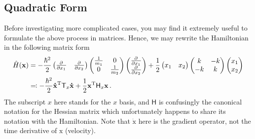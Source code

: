 \documentclass{article}
\theoremstyle{plain}\theoremheaderfont{\normalfont\itshape}\theorembodyfont{\rmfamily}\theoremseparator{.}\newtheorem*{rem}{Remark}\newtheorem*{ex}{Example}\newtheorem*{proof}{Proof}\newtheorem*{altp}{Alternative proof}
\theoremstyle{plain}\theoremheaderfont{\normalfont\bfseries}\theorembodyfont{\rmfamily}\theoremseparator{.}\newtheorem{thm}{Theorem}[section]\newtheorem{lem}[thm]{Lemma}\newtheorem{prop}[thm]{Proposition}\newtheorem*{cor}{Corollary}\newtheorem{defn}[thm]{Definition}\newtheorem{clm}[thm]{Claim}\newtheorem{clminproof}{Claim}
\theoremstyle{break}\theoremheaderfont{\normalfont\itshape}\theorembodyfont{\rmfamily}\theoremseparator{.\medskip}\newtheorem*{proofskip}{Proof}\newtheorem*{exs}{Examples}\newtheorem*{rems}{Remarks}
\theoremstyle{break}\theoremheaderfont{\normalfont\bfseries}\theorembodyfont{\rmfamily}\theoremseparator{.\medskip}\newtheorem{lemskip}[thm]{Lemma}\newtheorem{defnskip}[thm]{Definition}\newtheorem{propskip}[thm]{Proposition}\newtheorem{thmskip}[thm]{Theorem}
\numberwithin{equation}{section}
\newcommand{\tp}{^\mathrm{T}}
\newcommand{\pdv}[3][]{\frac{\partial^{#1} #2}{{\partial #3}^{#1}}}
\newcommand{\vb}[1]{\bm{\mathrm{#1}}}
\begin{document}
    \subsection{Quadratic Form}
    Before investigating more complicated cases, you may find it extremely useful to formulate the above process in matrices. Hence, we may rewrite the Hamiltonian in the following matrix form
    \begin{align}
        \hat{H}(\vb{x})&=-\frac{\hbar^2}{2}\begin{pmatrix}
            \pdv{}{x_1} & \pdv{}{x_2}
        \end{pmatrix}\begin{pmatrix}
            \frac{1}{m_1} & 0 \\
            0 & \frac{1}{m_2}
        \end{pmatrix}\begin{pmatrix}
            \pdv{}{x_1} \\ \pdv{}{x_2}
        \end{pmatrix}+\frac{1}{2}\begin{pmatrix}
            x_1 & x_2
        \end{pmatrix}\begin{pmatrix}
            k & -k \\
            -k & k
        \end{pmatrix}\begin{pmatrix}
            x_1 \\ x_2
        \end{pmatrix}\notag\\
        &\eqqcolon -\frac{\hbar^2}{2}\vb{\dot{x}}\tp\mathsf{T}_x\vb{\dot{x}}+\frac{1}{2}\vb{x}\tp\mathsf{H}_x\vb{x}\,.
    \end{align}
    The subscript \(x\) here stands for the \(x\) basis, and \(\mathsf{H}\) is confusingly the canonical notation for the Hessian matrix which unfortunately happens to share its notation with the Hamiltonian. Note that \(\dot{\vb{x}}\) here is the gradient operator, not the time derivative of \(\vb{x}\) (velocity).
\end{document}
